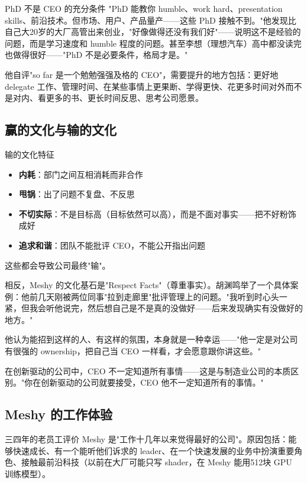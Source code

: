 \begin{knowledgebox}{PhD 不是 CEO 的充分条件}
"PhD 能教你 humble、work hard、presentation skills、前沿技术。但市场、用户、产品量产——这些 PhD 接触不到。"他发现比自己大20岁的大厂高管出来创业，"好像做得还没有我们好"——说明这不是经验的问题，而是学习速度和 humble 程度的问题。甚至李想（理想汽车）高中都没读完也做得很好——"PhD 不是必要条件，格局才是。"
\end{knowledgebox}

他自评"so far 是一个勉勉强强及格的 CEO"，需要提升的地方包括：更好地 delegate 工作、管理时间、在某些事情上更果断、学得更快、花更多时间对外而不是对内、看更多的书、更长时间反思、思考公司愿景。

\subsection{赢的文化与输的文化}

\begin{warningbox}{输的文化特征}
\begin{itemize}
\item \textbf{内耗}：部门之间互相消耗而非合作
\item \textbf{甩锅}：出了问题不复盘、不反思
\item \textbf{不切实际}：不是目标高（目标依然可以高），而是不面对事实——把不好粉饰成好
\item \textbf{追求和谐}：团队不能批评 CEO，不能公开指出问题
\end{itemize}
这些都会导致公司最终"输"。
\end{warningbox}

相反，Meshy 的文化基石是"Respect Facts"（尊重事实）。胡渊鸣举了一个具体案例：他前几天刚被两位同事"拉到走廊里"批评管理上的问题。"我听到时心头一紧，但我会听他说完，然后想自己是不是真的没做好——后来发现确实有没做好的地方。"

他认为能招到这样的人、有这样的氛围，本身就是一种幸运——"他一定是对公司有很强的 ownership，把自己当 CEO 一样看，才会愿意跟你讲这些。"

在创新驱动的公司中，CEO 不一定知道所有事情——这是与制造业公司的本质区别。"你在创新驱动的公司就要接受，CEO 他不一定知道所有的事情。"

\subsection{Meshy 的工作体验}

三四年的老员工评价 Meshy 是"工作十几年以来觉得最好的公司"。原因包括：能够快速成长、有一个能听他们诉求的 leader、在一个快速发展的业务中扮演重要角色、接触最前沿科技（以前在大厂可能只写 shader，在 Meshy 能用512块 GPU 训练模型）。

